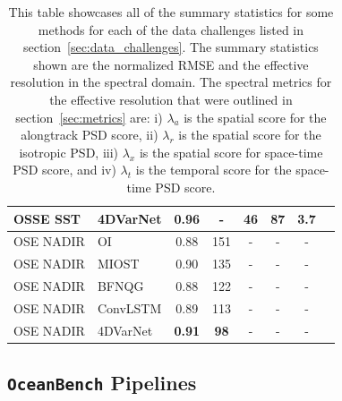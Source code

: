 \begin{table}[H]
{\begin{tabular}{llcccccc}
OSSE SST &  4DVarNet &  \textbf{0.96} & - & \textbf{46} & \textbf{87} & \textbf{3.7} \\
\midrule
OSE NADIR     &  OI & 0.88 & 151 & - &  - &  -\\
OSE NADIR     &  MIOST &  0.90 & 135 & - &  - &  -\\
OSE NADIR     &  BFNQG & 0.88 & 122 & - & - &  -\\
OSE NADIR &  ConvLSTM &  0.89 & 113 &- &  - &  -\\
OSE NADIR &  4DVarNet & \textbf{0.91} & \textbf{98} & - &  -  &  -\\
\bottomrule
\end{tabular}}
\caption{This table showcases all of the summary statistics for some methods for each of the data challenges listed in section~\ref{sec:data_challenges}. The summary statistics shown are the normalized RMSE and the effective resolution in the spectral domain. The spectral metrics for the effective resolution that were outlined in section~\ref{sec:metrics} are: i) $\lambda_a$ is the spatial score for the alongtrack PSD score, ii) $\lambda_r$ is the spatial score for the isotropic PSD, iii) $\lambda_x$ is the spatial score for space-time PSD score, and iv) $\lambda_t$ is the temporal score for the space-time PSD score.}
\label{tb:expresults}
\end{table}

\subsection*{\texttt{OceanBench} Pipelines}

